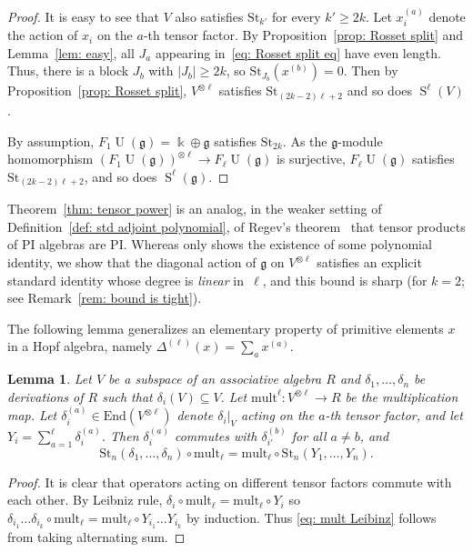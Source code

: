 \documentclass[12pt]{amsart}
\theoremstyle{plain}
\newtheorem{lemma}[theorem]{Lemma}
\theoremstyle{definition}
\numberwithin{equation}{theorem}
\newcommand{\kk}{\Bbbk}
\newcommand{\Sa}{\operatorname{S}}
\newcommand{\UU}{\operatorname{U}}
\newcommand{\g}{\mathfrak{g}}
\newcommand{\St}{\mathrm{St}}
\newcommand{\End}{\mathrm{End}}
\newcommand{\length}[1]{\left\lvert #1\right\rvert}
\newcommand{\mult}{\mathrm{mult}}
\begin{document}
\tensorpower*
\begin{proof}
    It is easy to see that $V$ also satisfies $\St_{k'}$ for every $k' \geq 2k$. Let $x_i^{(a)}$ denote the action of $x_i$ on the $a$-th tensor factor. 
    By Proposition~\ref{prop: Rosset split} and Lemma~\ref{lem: easy}, all $J_a$ appearing in~\eqref{eq: Rosset split eq} have even length. Thus, there is a block $J_{b}$ with $\length{J_{b}} \geq 2k$, so $\St_{J_{b}}(x^{(b)}) = 0$. Then by Proposition~\ref{prop: Rosset split}, $V^{\otimes \ell}$ satisfies $\St_{(2k-2)\ell+2}$ and so does $\Sa^\ell(V)$.

    By assumption, $F_1\UU(\g) = \kk \oplus \g$ satisfies $\St_{2k}$. As the $\g$-module homomorphism $(F_1\UU(\g))^{\otimes \ell} \rightarrow F_\ell \UU(\g)$ is surjective, $F_\ell \UU(\g)$ satisfies $\St_{(2k-2)\ell+2}$, and so does $\Sa^\ell(\g)$.
\end{proof}
Theorem~\ref{thm: tensor power} is an analog, in the weaker setting of Definition~\ref{def: std adjoint polynomial}, of Regev's theorem~\cite{Regev72} that tensor products of PI algebras are PI. Whereas \cite{Regev72} only shows the existence of some polynomial identity, we show that the diagonal action of $\g$ on $V^{\otimes \ell}$ satisfies an explicit standard identity whose degree is \emph{linear} in~$\ell$, and this bound is sharp (for $k = 2$; see Remark~\ref{rem: bound is tight}).

The following lemma generalizes an elementary property of primitive elements
$x$ in a Hopf algebra, namely $\Delta^{(\ell)}(x) = \sum_{a} x^{(a)}$.

\begin{lemma}\label{lem: mult Leibniz}
    Let $V$ be a subspace of an associative algebra $R$ and $\delta_1, \dots, \delta_n$ be derivations of $R$ such that $\delta_i(V) \subseteq V$. Let $\mult^\ell: V^{\otimes \ell} \to R$ be the multiplication map. Let $\delta_i^{(a)} \in \End(V^{\otimes \ell})$ denote $\delta_i|_V$ acting on the $a$-th tensor factor, and let $Y_i = \sum_{a=1}^\ell \delta_i^{(a)}$. Then $\delta_i^{(a)}$ commutes with $\delta_{i'}^{(b)}$ for all $a \neq b$, and  
    \begin{equation}\label{eq: mult Leibinz}
        \St_n(\delta_1, \dots, \delta_n) \circ \mult_\ell = \mult_\ell \circ \St_n(Y_1, \dots, Y_n).
    \end{equation}
\end{lemma}
\begin{proof}
    It is clear that operators acting on different tensor factors commute with each other. By Leibniz rule, $\delta_i \circ \mult_\ell = \mult_\ell \circ Y_i$ so $\delta_{i_1} \dots \delta_{i_k} \circ \mult_\ell = \mult_\ell \circ Y_{i_1} \dots Y_{i_k}$ by induction. Thus \eqref{eq: mult Leibinz} follows from taking alternating sum.
\end{proof}
\end{document}
